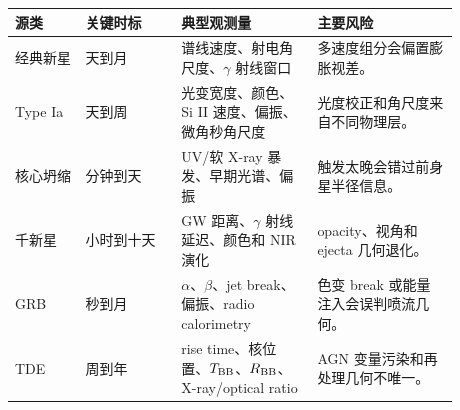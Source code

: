 \begin{longtable}{@{}p{0.14\linewidth}p{0.19\linewidth}p{0.27\linewidth}p{0.28\linewidth}@{}}
\toprule
源类 & 关键时标 & 典型观测量 & 主要风险 \\
\midrule
经典新星 & 天到月 & 谱线速度、射电角尺度、\(\gamma\) 射线窗口 & 多速度组分会偏置膨胀视差。 \\
Type Ia & 天到周 & 光变宽度、颜色、Si II 速度、偏振、微角秒角尺度 & 光度校正和角尺度来自不同物理层。 \\
核心坍缩 & 分钟到天 & UV/软 X-ray 暴发、早期光谱、偏振 & 触发太晚会错过前身星半径信息。 \\
千新星 & 小时到十天 & GW 距离、\(\gamma\) 射线延迟、颜色和 NIR 演化 & opacity、视角和 ejecta 几何退化。 \\
GRB & 秒到月 & \(\alpha\)、\(\beta\)、jet break、偏振、radio calorimetry & 色变 break 或能量注入会误判喷流几何。 \\
TDE & 周到年 & rise time、核位置、\(T_{\rm BB}\)、\(R_{\rm BB}\)、X-ray/optical ratio & AGN 变量污染和再处理几何不唯一。 \\
\bottomrule
\end{longtable}

